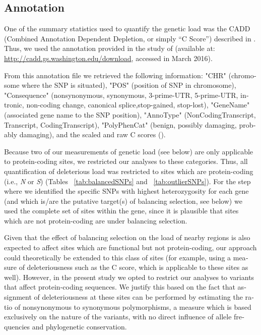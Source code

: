 \begin{refsection}
\begin{otherlanguage}{english}
\subsection{Annotation} 

One of the summary statistics used to quantify the genetic load was the CADD (Combined Annotation Dependent Depletion, or simply \enquote{C Score}) described in \textcite{Kircher2014}. Thus, we used the annotation provided in the study of \textcite{Kircher2014}  (available at: \url{http://cadd.gs.washington.edu/download}, accessed in March 2016).

From this annotation file we retrieved the following information: "CHR" (chromosome where the SNP is situated), "POS" (position of SNP in chromosome),  "Consequence" (nonsynonymous, synonymous, 3-prime-UTR, 5-prime-UTR, intronic, non-coding change, canonical splice,stop-gained, stop-lost),  "GeneName" (associated gene name to the SNP position), "AnnoType" (NonCodingTranscript, Transcript, CodingTranscript), "PolyPhenCat" (benign, possibly damaging, probably damaging), and the scaled and raw C scores (\cite{Kircher2014}). 

Because two of our measurements of genetic load (see below) are only applicable to protein-coding sites, we restricted our analyses to these categories. Thus, all quantification of deleterious load was restricted to sites which are protein-coding (i.e., \emph{N} or \emph{S}) (Tables ~\ref{tab:balancedSNPs} and ~\ref{tab:outlierSNPs}). For the step where we identified the specific SNPs with highest heterozygosity for each gene (and which is/are the putative target(s) of balancing selection, see below) we used the complete set of sites within the gene, since it is plausible that sites which are not protein-coding are under balancing selection. 

Given that the effect of balancing selection on the load of nearby regions is also expected to affect sites which are functional but not protein-coding, our approach could theoretically be extended to this class of sites (for example, using a measure of deleteriousness such as the C score, which is applicable to these sites as well). However, in the present study we opted to restrict our analyses to variants that affect protein-coding sequences. We justify this based on the fact that assignment of deleteriousness at these sites can be performed by estimating the ratio of nonsynonymous to synonymous polymorphisms, a measure which is based exclusively on the nature of the variants, with no direct influence of allele frequencies and phylogenetic conservation. 


\end{otherlanguage}
\end{refsection}
